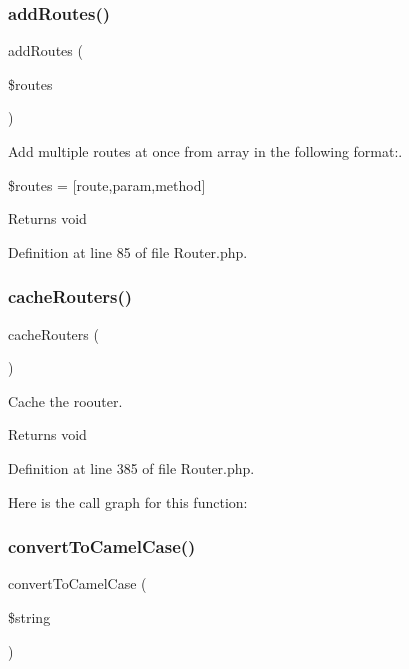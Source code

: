 \subsubsection{\texorpdfstring{add\+Routes()}{addRoutes()}}
{\footnotesize\ttfamily add\+Routes (\begin{DoxyParamCaption}\item[{}]{\$routes }\end{DoxyParamCaption})}

Add multiple routes at once from array in the following format\+:.

\$routes = \mbox{[}route,param,method\mbox{]}

\begin{DoxyReturn}{Returns}
void 
\end{DoxyReturn}


Definition at line 85 of file Router.\+php.

\mbox{\label{class_zest_1_1_router_1_1_router_a51dd0e2e8e330032b9bfaa0d4b077638}} 
\subsubsection{\texorpdfstring{cache\+Routers()}{cacheRouters()}}
{\footnotesize\ttfamily cache\+Routers (\begin{DoxyParamCaption}{ }\end{DoxyParamCaption})}

Cache the roouter.

\begin{DoxyReturn}{Returns}
void 
\end{DoxyReturn}


Definition at line 385 of file Router.\+php.

Here is the call graph for this function\+:
\mbox{\label{class_zest_1_1_router_1_1_router_ac8113e94342833c6df305638210875f5}} 
\subsubsection{\texorpdfstring{convert\+To\+Camel\+Case()}{convertToCamelCase()}}
{\footnotesize\ttfamily convert\+To\+Camel\+Case (\begin{DoxyParamCaption}\item[{}]{\$string }\end{DoxyParamCaption})\hspace{0.3cm}{\ttfamily [protected]}}

